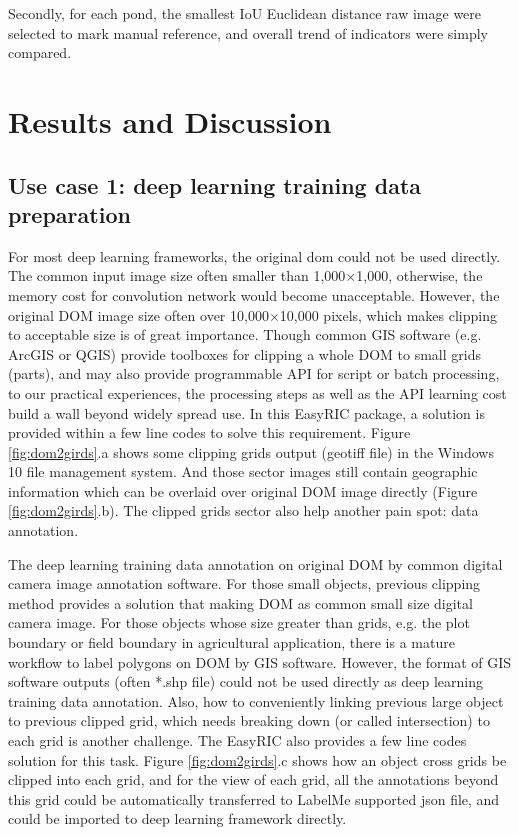 \documentclass{configs/bmcart}
\begin{document}
Secondly, for each pond, the smallest IoU Euclidean distance raw image were selected to mark manual reference, and overall trend of indicators were simply compared.

\section*{Results and Discussion}

\subsection*{Use case 1: deep learning training data preparation}
For most deep learning frameworks, the original \acrfull*{dom} could not be used directly. The common input image size often smaller than 1,000$\times$1,000, otherwise, the memory cost for convolution network would become unacceptable. However, the original DOM image size often over 10,000$\times$10,000 pixels, which makes clipping to acceptable size is of great importance. Though common GIS software (e.g. ArcGIS or QGIS) provide toolboxes for clipping a whole DOM to small grids (parts), and may also provide programmable API for script or batch processing, to our practical experiences, the processing steps as well as the API learning cost build a wall beyond widely spread use. In this EasyRIC package, a solution is provided within a few line codes to solve this requirement. Figure \ref{fig:dom2girds}.a shows some clipping grids output (geotiff file) in the Windows 10 file management system. And those sector images still contain geographic information which can be overlaid over original DOM image directly (Figure \ref{fig:dom2girds}.b). The clipped grids sector also help another pain spot: data annotation.

The deep learning training data annotation on original DOM by common digital camera image annotation software. For those small objects, previous clipping method provides a solution that making DOM as common small size digital camera image. For those objects whose size greater than grids, e.g. the plot boundary or field boundary in agricultural application, there is a mature workflow to label polygons on DOM by GIS software. However, the format of GIS software outputs (often *.shp file) could not be used directly as deep learning training data annotation. Also, how to conveniently linking previous large object to previous clipped grid, which needs breaking down (or called intersection) to each grid is another challenge. The EasyRIC also provides a few line codes solution for this task. Figure \ref{fig:dom2girds}.c shows how an object cross grids be clipped into each grid, and for the view of each grid, all the annotations beyond this grid could be automatically transferred to LabelMe supported json file, and could be imported to deep learning framework directly.
\end{document}
